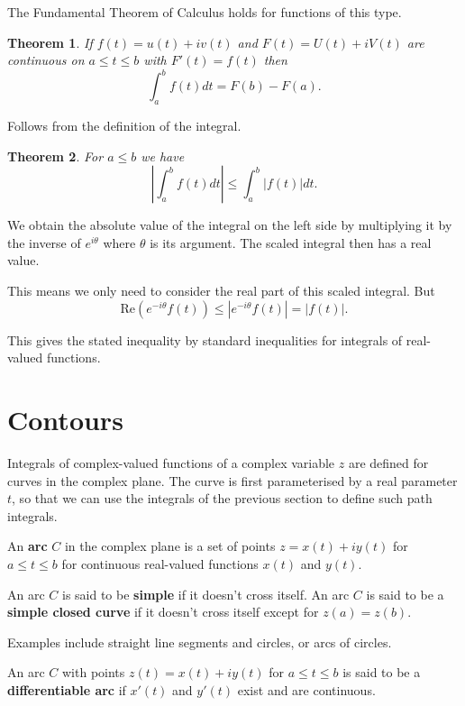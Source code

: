 \documentclass[a4paper,10pt]{article}
\newtheorem{theorem}{Theorem}[section]
\newenvironment{definition}[1][Definition]{\begin{trivlist}
\item[\hskip \labelsep {\bfseries #1}]}{\end{trivlist}}
\begin{document}
The Fundamental Theorem of Calculus holds for functions of this type.

\begin{theorem}
If $f(t) = u(t) + iv(t)$ and $F(t) = U(t) + iV(t)$ are continuous on $a \leq t \leq b$ with $F'(t) = f(t)$ then
$$\int_a^b f(t)dt = F(b) - F(a).$$
\end{theorem}

Follows from the definition of the integral.

\begin{theorem}
For $a \leq b$ we have
$$\left|\int_a^b f(t)dt\right| \leq \int_a^b |f(t)|dt.$$
\end{theorem}

We obtain the absolute value of the integral on the left side by multiplying it by the inverse of $e^{i\theta}$ where $\theta$ is its argument. The scaled integral then has a real value.

This means we only need to consider the real part of this scaled integral. But
$$\mbox{Re}(e^{-i\theta}f(t)) \leq \left|e^{-i\theta}f(t)\right| = \left|f(t)\right|.$$

This gives the stated inequality by standard inequalities for integrals of real-valued functions.

\section{Contours}

Integrals of complex-valued functions of a complex variable $z$ are defined for curves in the complex plane. The curve is first parameterised by a real parameter $t$, so that we can use the integrals of the previous section to define such path integrals.

\begin{definition}
An \textbf{arc} $C$ in the complex plane is a set of points $z = x(t) + iy(t)$ for $a \leq t \leq b$ for continuous real-valued functions $x(t)$ and $y(t)$.
\end{definition}

\begin{definition}
An arc $C$ is said to be \textbf{simple} if it doesn't cross itself. An arc $C$ is said to be a \textbf{simple closed curve} if it doesn't cross itself except for $z(a) = z(b)$.
\end{definition}

Examples include straight line segments and circles, or arcs of circles.

\begin{definition}
An arc $C$ with points $z(t) = x(t) + iy(t)$ for $a \leq t \leq b$ is said to be a \textbf{differentiable arc} if $x'(t)$ and $y'(t)$ exist and are continuous.
\end{definition}
\end{document}
